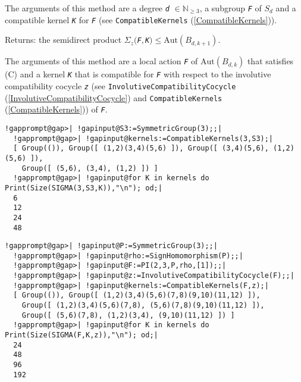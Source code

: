 \documentclass[a4paper,11pt]{report}
\begin{document}
{{{\begin{description}
 The arguments of this method are a degree \mbox{\texttt{\mdseries\slshape d}} $\in\mathbb{N}_{\ge 3}$, a subgroup \mbox{\texttt{\mdseries\slshape F}} of $S_{d}$ and a compatible kernel \mbox{\texttt{\mdseries\slshape K}} for \mbox{\texttt{\mdseries\slshape F}} (see \texttt{CompatibleKernels} (\ref{CompatibleKernels})). 
\item[{for the arguments \mbox{\texttt{\mdseries\slshape d}}, \mbox{\texttt{\mdseries\slshape k}}, \mbox{\texttt{\mdseries\slshape F}}, \mbox{\texttt{\mdseries\slshape K}}, \mbox{\texttt{\mdseries\slshape z}}}]  Returns: the semidirect product $\Sigma_{z}($\mbox{\texttt{\mdseries\slshape F}}$,$\mbox{\texttt{\mdseries\slshape K}}$)\le\mathrm{Aut}(B_{d,k+1})$. 

 The arguments of this method are a local action \mbox{\texttt{\mdseries\slshape F}} of $\mathrm{Aut}(B_{d,k})$ that satisfies (C) and a kernel \mbox{\texttt{\mdseries\slshape K}} that is compatible for \mbox{\texttt{\mdseries\slshape F}} with respect to the involutive compatibility cocycle \mbox{\texttt{\mdseries\slshape z}} (see \texttt{InvolutiveCompatibilityCocycle} (\ref{InvolutiveCompatibilityCocycle}) and \texttt{CompatibleKernels} (\ref{CompatibleKernels})) of \mbox{\texttt{\mdseries\slshape F}}. 
\end{description}
 

 }

 

 
\begin{Verbatim}[commandchars=!@|,fontsize=\small,frame=single,label=Example]
  !gapprompt@gap>| !gapinput@S3:=SymmetricGroup(3);;|
  !gapprompt@gap>| !gapinput@kernels:=CompatibleKernels(3,S3);|
  [ Group(()), Group([ (1,2)(3,4)(5,6) ]), Group([ (3,4)(5,6), (1,2)(5,6) ]), 
    Group([ (5,6), (3,4), (1,2) ]) ]
  !gapprompt@gap>| !gapinput@for K in kernels do Print(Size(SIGMA(3,S3,K)),"\n"); od;|
  6
  12
  24
  48
\end{Verbatim}
 

 
\begin{Verbatim}[commandchars=!@|,fontsize=\small,frame=single,label=Example]
  !gapprompt@gap>| !gapinput@P:=SymmetricGroup(3);;|
  !gapprompt@gap>| !gapinput@rho:=SignHomomorphism(P);;|
  !gapprompt@gap>| !gapinput@F:=PI(2,3,P,rho,[1]);;|
  !gapprompt@gap>| !gapinput@z:=InvolutiveCompatibilityCocycle(F);;|
  !gapprompt@gap>| !gapinput@kernels:=CompatibleKernels(F,z);|
  [ Group(()), Group([ (1,2)(3,4)(5,6)(7,8)(9,10)(11,12) ]), 
    Group([ (1,2)(3,4)(5,6)(7,8), (5,6)(7,8)(9,10)(11,12) ]), 
    Group([ (5,6)(7,8), (1,2)(3,4), (9,10)(11,12) ]) ]
  !gapprompt@gap>| !gapinput@for K in kernels do Print(Size(SIGMA(F,K,z)),"\n"); od;|
  24
  48
  96
  192
\end{Verbatim}
 }

 }
\end{document}
